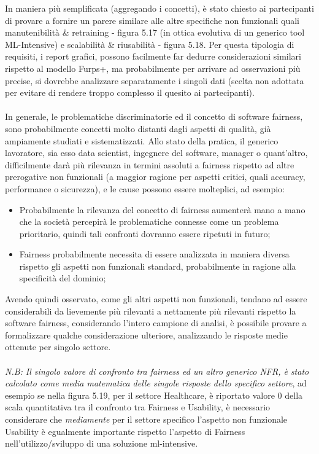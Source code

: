     In maniera più semplificata (aggregando i concetti), è stato chiesto ai partecipanti di provare a fornire un parere similare alle altre specifiche non funzionali quali manutenibilità \& retraining - figura 5.17 (in ottica evolutiva di un generico tool ML-Intensive) e scalabilità \& riusabilità - figura 5.18. Per questa tipologia di requisiti, i report grafici, possono facilmente far dedurre considerazioni similari rispetto al modello Furps+, ma probabilmente per arrivare ad osservazioni più precise, si dovrebbe analizzare separatamente i singoli dati (scelta non adottata per evitare di rendere troppo complesso il quesito ai partecipanti).\\\\
    
    In generale, le problematiche discriminatorie ed il concetto di software fairness, sono probabilmente concetti molto distanti dagli aspetti di qualità, già ampiamente studiati e sistematizzati. Allo stato della pratica, il generico lavoratore, sia esso data scientist, ingegnere del software, manager o quant'altro, difficilmente darà  più rilevanza in termini assoluti a fairness rispetto ad altre prerogative non funzionali (a maggior ragione per aspetti critici, quali accuracy, performance o sicurezza), e le cause possono essere molteplici, ad esempio:
    
    \begin{itemize}
        \item Probabilmente la rilevanza del concetto di fairness aumenterà mano a mano che la società percepirà le problematiche connesse come un problema prioritario, quindi tali confronti dovranno essere ripetuti in futuro;
        \item Fairness probabilmente necessita di essere analizzata in maniera diversa rispetto gli aspetti non funzionali standard, probabilmente in ragione alla specificità del dominio;

    \end{itemize}
    
    
    Avendo quindi osservato, come gli altri aspetti non funzionali, tendano ad essere considerabili da lievemente più rilevanti a nettamente più rilevanti rispetto la software fairness, considerando l'intero campione di analisi, è possibile provare a formalizzare qualche considerazione ulteriore, analizzando le risposte medie ottenute per singolo settore.\\\\ 
    \emph{N.B: Il singolo valore di confronto tra fairness ed un altro generico NFR, è stato calcolato come media matematica delle singole risposte dello specifico settore}, ad esempio se nella figura 5.19, per il settore Healthcare, è riportato valore 0 della scala quantitativa tra il confronto tra Fairness e Usability, è necessario considerare che \emph{mediamente} per il settore specifico l'aspetto non funzionale Usability è egualmente importante rispetto l'aspetto di Fairness nell'utilizzo/sviluppo di una soluzione ml-intensive.
    

